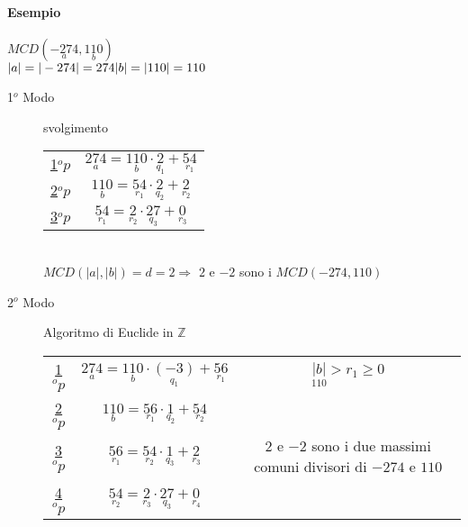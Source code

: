 	\paragraph{Esempio}$MCD(\underset{a}{-274},\underset{b}{110})$\\
	$|a|=|-274|=274\\|b|=|110|=110$\\
	\begin{description}
		\item[1$^o$ Modo]svolgimento \\
            \begin{tabular}{c c}
                \underline{1$^o p$} & $\underset{a}{274}=\underset{b}{110}\cdot\underset{q_1}{2}+\underset{r_1}{54}$  \\
                \underline{2$^o p$} & $\underset{b}{110}=\underset{r_1}{54}\cdot\underset{q_2}{2}+\underset{r_2}{2}$   \\
                \underline{3$^o p$} & $\underset{r_1}{54}=\underset{r_2}{2}\cdot\underset{q_3}{27}+\underset{r_3}{0}$ \\ 
            \end{tabular}\\
	$MCD(|a|,|b|)=d=2\Longrightarrow$ $2$ e $-2$ sono i $MCD(-274,110)$
\item[2$^o$ Modo] Algoritmo di Euclide in $\mathbb{Z}$\\
            \begin{tabular}{c c c}
                \underline{1$^o p$} & $\underset{a}{274}=\underset{b}{110}\cdot\underset{q_1}{(-3)}+\underset{r_1}{56}$ & $\underset{110}{|b|}>r_1\geq 0$ \\
                \underline{2$^o p$} & $\underset{b}{110}=\underset{r_1}{56}\cdot\underset{q_2}{1}+\underset{r_2}{54}$ &  \\
                \underline{3$^o p$} & $\underset{r_1}{56}=\underset{r_2}{54}\cdot\underset{q_3}{1}+\underset{r_3}{2}$ & $2$ e $-2$ sono i due massimi comuni divisori di $-274$ e $110$\\ 
                \underline{4$^o p$} & $\underset{r_2}{54}=\underset{r_3}{2}\cdot\underset{q_3}{27}+\underset{r_4}{0}$ \\ 
            \end{tabular}\\
    \end{description}
